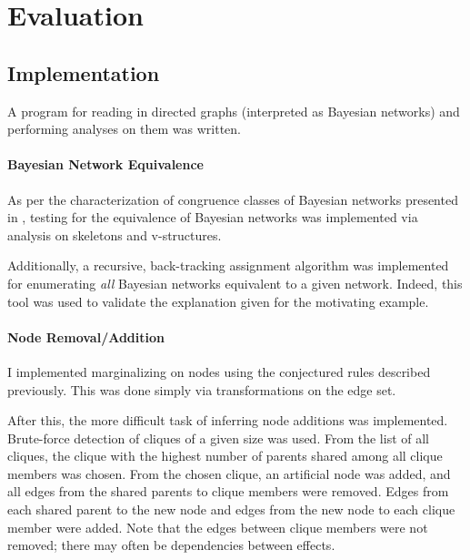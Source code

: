 \documentclass{article}
\begin{document}
	
	
	
	
	
	\section{Evaluation}
	\label{evaluation}
	
	\subsection{Implementation}
	
	A program for reading in directed graphs (interpreted as Bayesian networks) and performing analyses on them was written.
	
	\paragraph{Bayesian Network Equivalence}
	As per the characterization of congruence classes of Bayesian networks presented in \cite{verma2013equivalence,chickering2013transformational}, testing for the equivalence of Bayesian networks was implemented via analysis on skeletons and v-structures.
	
	Additionally, a recursive, back-tracking assignment algorithm was implemented for enumerating \emph{all} Bayesian networks equivalent to a given network.
	Indeed, this tool was used to validate the explanation given for the motivating example.
	
	\paragraph{Node Removal/Addition}
	I implemented marginalizing on nodes using the conjectured rules described previously. This was done simply via transformations on the edge set.
	
	After this, the more difficult task of inferring node additions was implemented.
	Brute-force detection of cliques of a given size was used.
	From the list of all cliques, the clique with the highest number of parents shared among all clique members was chosen.
	From the chosen clique, an artificial node was added, and all edges from the shared parents to clique members were removed.
	Edges from each shared parent to the new node and edges from the new node to each clique member were added.
	Note that the edges between clique members were not removed; there may often be dependencies between effects.
	
\end{document}

